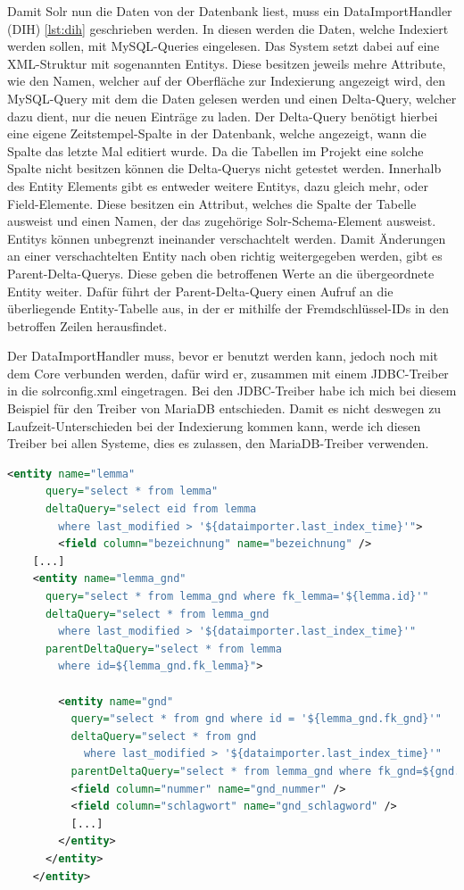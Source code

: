 Damit Solr nun die Daten von der Datenbank liest, muss ein DataImportHandler (DIH) \ref{lst:dih} geschrieben werden. In diesen werden die Daten, welche Indexiert werden sollen, mit MySQL-Queries eingelesen. Das System setzt dabei auf eine XML-Struktur mit sogenannten Entitys. Diese besitzen jeweils mehre Attribute, wie den Namen, welcher auf der Oberfläche zur Indexierung angezeigt wird, den MySQL-Query mit dem die Daten gelesen werden und einen Delta-Query, welcher dazu dient, nur die neuen Einträge zu laden. Der Delta-Query benötigt hierbei eine eigene Zeitstempel-Spalte in der Datenbank, welche angezeigt, wann die Spalte das letzte Mal editiert wurde. Da die Tabellen im Projekt eine solche Spalte nicht besitzen können die Delta-Querys nicht getestet werden. 
Innerhalb des Entity Elements gibt es entweder weitere Entitys, dazu gleich mehr, oder Field-Elemente. Diese besitzen ein Attribut, welches die Spalte der Tabelle ausweist und einen Namen, der das zugehörige Solr-Schema-Element ausweist. 
Entitys können unbegrenzt ineinander verschachtelt werden. Damit Änderungen an einer verschachtelten Entity nach oben richtig weitergegeben werden, gibt es Parent-Delta-Querys. Diese geben die betroffenen Werte an die übergeordnete Entity weiter. Dafür führt der Parent-Delta-Query einen Aufruf an die überliegende Entity-Tabelle aus, in der er mithilfe der Fremdschlüssel-IDs in den betroffen Zeilen herausfindet.

Der DataImportHandler muss, bevor er benutzt werden kann, jedoch noch mit dem Core verbunden werden, dafür wird er, zusammen mit einem JDBC-Treiber in die solrconfig.xml eingetragen. Bei den JDBC-Treiber habe ich mich bei diesem Beispiel für den Treiber von MariaDB entschieden. Damit es nicht deswegen zu Laufzeit-Unterschieden bei der Indexierung kommen kann, werde ich diesen Treiber bei allen Systeme, dies es zulassen, den MariaDB-Treiber verwenden.

\begin{lstlisting}[language=xml, frame=single, label={lst:dih}, 
    morekeywords={entity,query,deltaQuery,parentDeltaQuery,field,column, name}] 
    <entity name="lemma" 
      query="select * from lemma" 
      deltaQuery="select eid from lemma 
        where last_modified > '${dataimporter.last_index_time}'"> 
		<field column="bezeichnung" name="bezeichnung" />
    [...]
    <entity name="lemma_gnd" 
      query="select * from lemma_gnd where fk_lemma='${lemma.id}'"
      deltaQuery="select * from lemma_gnd 
        where last_modified > '${dataimporter.last_index_time}'"
      parentDeltaQuery="select * from lemma 
        where id=${lemma_gnd.fk_lemma}">
			
        <entity name="gnd" 
          query="select * from gnd where id = '${lemma_gnd.fk_gnd}'"
          deltaQuery="select * from gnd 
            where last_modified > '${dataimporter.last_index_time}'"
          parentDeltaQuery="select * from lemma_gnd where fk_gnd=${gnd.id}">
          <field column="nummer" name="gnd_nummer" />
          <field column="schlagwort" name="gnd_schlagword" />
          [...]
        </entity>
      </entity>  
    </entity>
\end{lstlisting}

